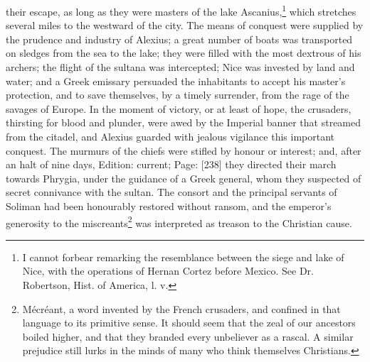 their escape, as long as they were masters of the lake Ascanius,\footnote{I cannot forbear remarking the resemblance between the siege and lake of Nice, with the operations of Hernan Cortez before Mexico. See Dr. Robertson, Hist. of America, l. v.} which stretches several miles to the westward of the city. The means of conquest were supplied by the prudence and industry of Alexius; a great number of boats was transported on sledges from the sea to the lake; they were filled with the most dextrous of his archers; the flight of the sultana was intercepted; Nice was invested by land and water; and a Greek emissary persuaded the inhabitants to accept his master\texthebrew{}’s protection, and to save themselves, by a timely surrender, from the rage of the savages of Europe. In the moment of victory, or at least of hope, the crusaders, thirsting for blood and plunder, were awed by the Imperial banner that streamed from the citadel, and Alexius guarded with jealous vigilance this important conquest. The murmurs of the chiefs were stifled by honour or interest; and, after an halt of nine days, Edition: current; Page: [238] they directed their march towards Phrygia, under the guidance of a Greek general, whom they suspected of secret connivance with the sultan. The consort and the principal servants of Soliman had been honourably restored without ransom, and the emperor\texthebrew{}’s generosity to the miscreants\footnote{Mécréant, a word invented by the French crusaders, and confined in that language to its primitive sense. It should seem that the zeal of our ancestors boiled higher, and that they branded every unbeliever as a rascal. A similar prejudice still lurks in the minds of many who think themselves Christians.} was interpreted as treason to the Christian cause.

